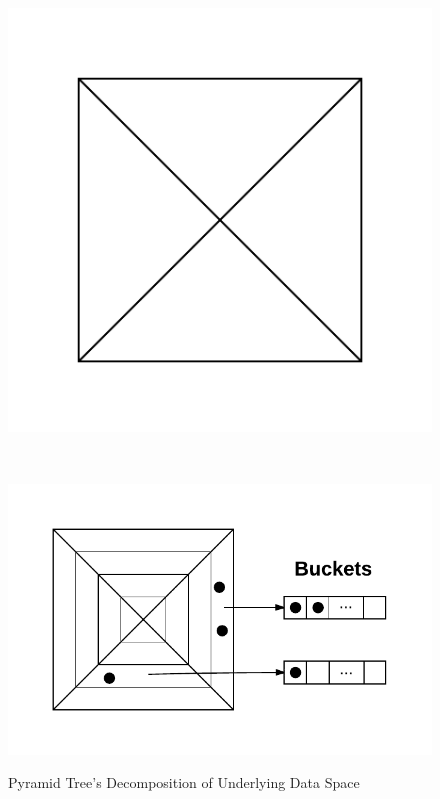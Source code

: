 \begin{figure}
		\begin{center}
			\begin{subfloat}{%
				\includegraphics[scale=0.7]{figures/pyramid_tree_partition.pdf}
			}
			\end{subfloat}~
			\begin{subfloat} {%
				\includegraphics[scale=0.7]{figures/pyramid_tree_buckets.pdf}
			}
			\end{subfloat}
		\end{center}

		\caption{Pyramid Tree's Decomposition of Underlying Data Space}
		\label{fig:pyramid-tree-partition}
\end{figure}

